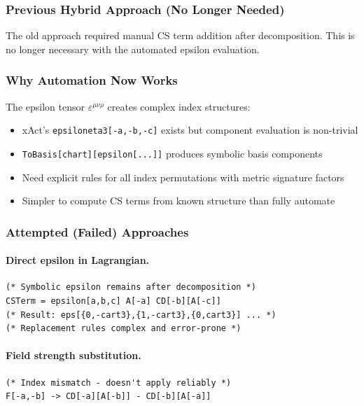 \subsubsection{Previous Hybrid Approach (No Longer Needed)}
\label{sec:cs-hybrid}

The old approach required manual CS term addition after decomposition.
This is no longer necessary with the automated epsilon evaluation.

\subsubsection{Why Automation Now Works}
\label{sec:cs-why-automation}

The epsilon tensor $\varepsilon^{\mu\nu\rho}$ creates complex index structures:

\begin{itemize}
  \item xAct's \texttt{epsiloneta3[-a,-b,-c]} exists but component evaluation is non-trivial
  \item \texttt{ToBasis[chart][epsilon[...]]} produces symbolic basis components
  \item Need explicit rules for all index permutations with metric signature factors
  \item Simpler to compute CS terms from known structure than fully automate
\end{itemize}

\subsubsection{Attempted (Failed) Approaches}
\label{sec:cs-failed}

\paragraph{Direct epsilon in Lagrangian.}
\label{par:cs-direct-epsilon}
\begin{lstlisting}[style=mathematica]
(* Symbolic epsilon remains after decomposition *)
CSTerm = epsilon[a,b,c] A[-a] CD[-b][A[-c]]
(* Result: eps[{0,-cart3},{1,-cart3},{0,cart3}] ... *)
(* Replacement rules complex and error-prone *)
\end{lstlisting}

\paragraph{Field strength substitution.}
\label{par:cs-field-strength}
\begin{lstlisting}[style=mathematica]
(* Index mismatch - doesn't apply reliably *)
F[-a,-b] -> CD[-a][A[-b]] - CD[-b][A[-a]]
\end{lstlisting}

